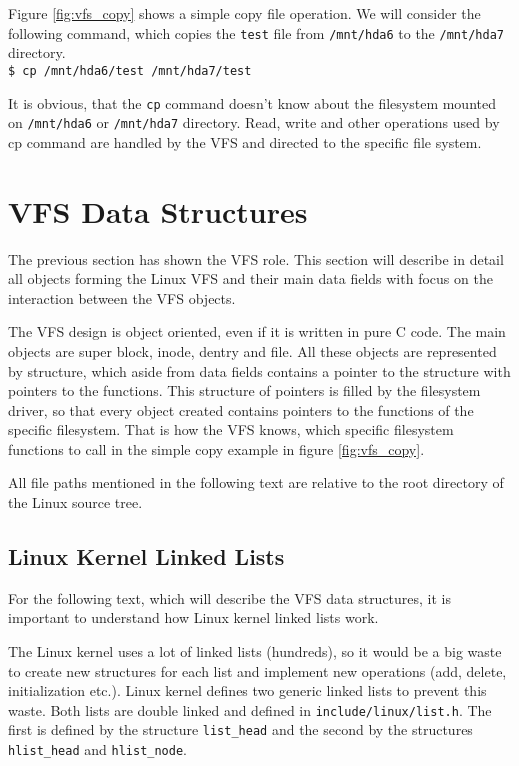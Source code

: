 Figure \ref{fig:vfs_copy} shows a simple copy file operation. We will consider the
following command, which copies the \texttt{test} file from \texttt{/mnt/hda6} to
the \texttt{/mnt/hda7} directory. \\

\texttt{\$ cp /mnt/hda6/test /mnt/hda7/test\\}

It is obvious, that the \texttt{cp} command doesn't know about the filesystem
mounted on \texttt{/mnt/hda6} or \texttt{/mnt/hda7} directory. Read, write and other
operations used by cp command are handled by the VFS and directed to the specific file
system.

\section{VFS Data Structures}
\label{lab:data_struct}
The previous section has shown the VFS role. This section will describe in detail all
objects forming the Linux VFS and their main data fields with focus on the interaction
between the VFS objects.

The VFS design is object oriented, even if it is written in pure C code. The main objects
are super block, inode, dentry and file. All these objects are represented by
structure, which aside from data fields contains a pointer to the structure with
pointers to the functions. This structure of pointers is filled by the filesystem
driver, so that every object created contains pointers to the functions of the
specific filesystem. That is how the VFS knows, which specific filesystem functions
to call in the simple copy example in figure \ref{fig:vfs_copy}.

All file paths mentioned in the following text are relative to the root directory
of the Linux source tree. 

\subsection{Linux Kernel Linked Lists}
For the following text, which will describe the VFS data structures, it is important to
understand how Linux kernel linked lists work.

The Linux kernel uses a lot of linked lists (hundreds), so it would be a big waste to
create new structures for each list and implement new operations (add, delete,
initialization etc.). Linux kernel defines two generic linked lists to prevent
this waste. Both lists are double linked and defined in 
\texttt{include/linux/list.h}. The first is defined by the structure \texttt{list\_head}
and the second by the structures \texttt{hlist\_head} and \texttt{hlist\_node}.


